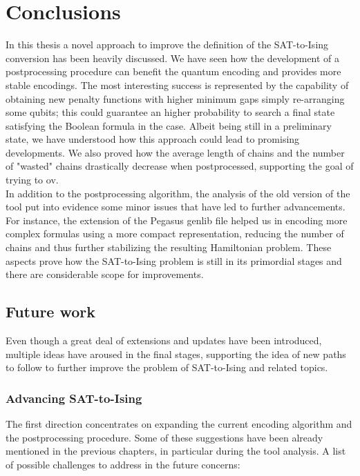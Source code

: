 \chapter{Conclusions}
\label{cha:conclusioni}

In this thesis a novel approach to improve the definition of the SAT-to-Ising conversion has been heavily discussed. We have seen how the development of a postprocessing procedure can benefit the quantum encoding and provides more stable encodings. The most interesting success is represented by the capability of obtaining new penalty functions with higher minimum gaps simply re-arranging some qubits; this could guarantee an higher probability to search a final state satisfying the Boolean formula in the case. Albeit being still in a preliminary state, we have understood how this approach could lead to promising developments. We also proved how the average length of chains and the number of "wasted" chains drastically decrease when postprocessed, supporting the goal of trying to ov. \\
In addition to the postprocessing algorithm, the analysis of the old version of the tool put into evidence some minor issues that have led to further advancements. For instance, the extension of the Pegasus genlib file helped us in encoding more complex formulas using a more compact representation, reducing the number of chains and thus further stabilizing the resulting Hamiltonian problem. These aspects prove how the SAT-to-Ising problem is still in its primordial stages and there are considerable scope for improvements.

\section{Future work}

Even though a great deal of extensions and updates have been introduced, multiple ideas have aroused in the final stages, supporting the idea of new paths to follow to further improve the problem of SAT-to-Ising and related topics.

\subsection{Advancing SAT-to-Ising}

The first direction concentrates on expanding the current encoding algorithm and the postprocessing procedure. Some of these suggestions have been already mentioned in the previous chapters, in particular during the tool analysis. A list of possible challenges to address in the future concerns:

